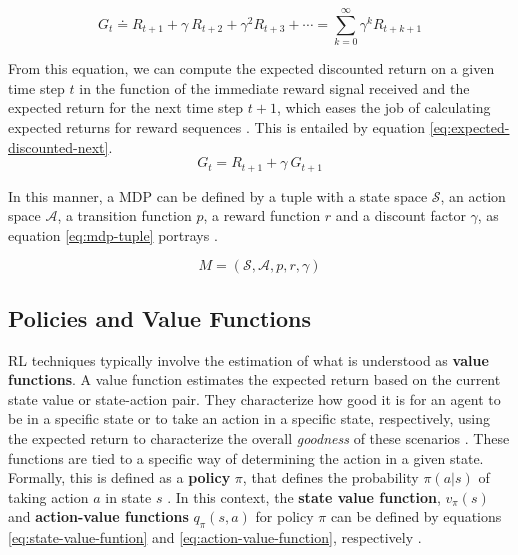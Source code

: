\begin{equation} \label{eq:expected-discounted-return}
	G_t \doteq R_{t+1} + \gamma\ R_{t+2} + \gamma^2 R_{t+3} + \cdots = \sum^\infty_{k = 0} \gamma^k R_{t+k+1}
\end{equation}

From this equation, we can compute the expected discounted return on a given time step $t$ in the function of the immediate reward signal received and the expected return for the next time step $t +1$, which eases the job of calculating expected returns for reward sequences \cite{suttonReinforcementLearningIntroduction2014}. This is entailed by equation \ref{eq:expected-discounted-next}.
\begin{equation} \label{eq:expected-discounted-next}
	G_t = R_{t+1} + \gamma\ G_{t+1}
\end{equation}

In this manner, a \ac{MDP} can be defined by a tuple with a state space $\mathcal{S}$, an action space $\mathcal{A}$, a transition function $p$, a reward function $r$ and a discount factor $\gamma$, as equation \ref{eq:mdp-tuple} portrays \cite{brunskillCS234ReinforcementLearning}.

\begin{equation} \label{eq:mdp-tuple}
	M = (\mathcal{S}, \mathcal{A}, p, r, \gamma)
\end{equation}

\subsection{Policies and Value Functions}

\ac{RL} techniques typically involve the estimation of what is understood as \textbf{value functions}. A value function estimates the expected return based on the current state value or state-action pair. They characterize how good it is for an agent to be in a specific state or to take an action in a specific state, respectively, using the expected return to characterize the overall \textit{goodness} of these scenarios \cite{suttonReinforcementLearningIntroduction2014, moralesGrokkingDeepReinforcement2020}. These functions are tied to a specific way of determining the action in a given state. Formally, this is defined as a \textbf{policy} $\pi$, that defines the probability $\pi(a|s)$ of taking action $a$ in state $s$ \cite{suttonReinforcementLearningIntroduction2014}. In this context, the \textbf{state value function}, $v_\pi(s)$ and \textbf{action-value functions} $q_\pi(s,a)$ for policy $\pi$ can be defined by equations \ref{eq:state-value-funtion} and \ref{eq:action-value-function}, respectively \cite{suttonReinforcementLearningIntroduction2014}.

